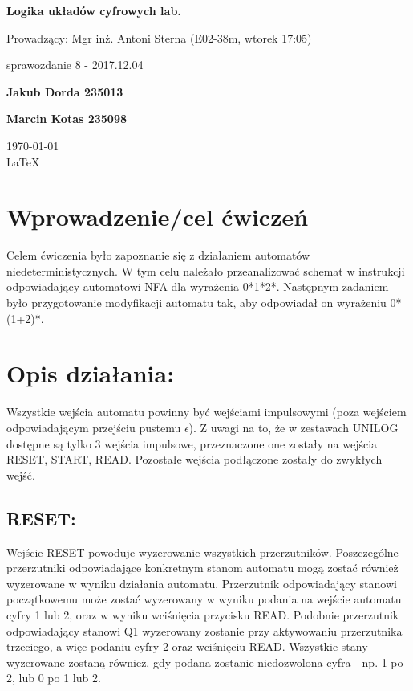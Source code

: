 \documentclass[12pt,a4paper]{article}
\begin{document}
	
	\begin{titlepage}
		
		\centering
		{\huge\bfseries Logika układów cyfrowych lab.\par}
		
		\vspace{0.5cm}
		Prowadzący: Mgr inż. Antoni Sterna (E02-38m, wtorek 17:05) \\
	
		\vspace{1.1cm}
		{\Large sprawozdanie 8 - 2017.12.04\par}
		\vfill
		
		{\large\bfseries Jakub Dorda 235013\par}
		{\large\bfseries Marcin Kotas 235098\par}
		
		\vspace{1cm}
		\today \\ \LaTeX
		
		\restoregeometry
	\end{titlepage}


	\section{Wprowadzenie/cel ćwiczeń}
	
		Celem ćwiczenia było zapoznanie się z działaniem automatów niedeterministycznych.
		W tym celu należało przeanalizować schemat w instrukcji odpowiadający automatowi NFA dla wyrażenia 0*1*2*.
		Następnym zadaniem było przygotowanie modyfikacji automatu tak, aby odpowiadał on wyrażeniu 0*(1+2)*.
		
	\section{Opis działania:}

			Wszystkie wejścia automatu powinny być wejściami impulsowymi (poza wejściem odpowiadającym przejściu pustemu \(\epsilon\)).
			Z uwagi na to, że w zestawach UNILOG dostępne są tylko 3 wejścia impulsowe, przeznaczone one zostały na wejścia RESET, START, READ.
			Pozostałe wejścia podłączone zostały do zwykłych wejść.

		\subsection{RESET:}
			Wejście RESET powoduje wyzerowanie wszystkich przerzutników.
			Poszczególne przerzutniki odpowiadające konkretnym stanom automatu mogą zostać również wyzerowane w wyniku działania automatu.
			Przerzutnik odpowiadający stanowi początkowemu może zostać wyzerowany w wyniku podania na wejście automatu cyfry 1 lub 2, oraz w wyniku wciśnięcia przycisku READ.
			Podobnie przerzutnik odpowiadający stanowi Q1 wyzerowany zostanie przy aktywowaniu przerzutnika trzeciego, a więc podaniu cyfry 2 oraz wciśnięciu READ.
			Wszystkie stany wyzerowane zostaną również, gdy podana zostanie niedozwolona cyfra - np. 1 po 2, lub 0 po 1 lub 2.
\end{document}
